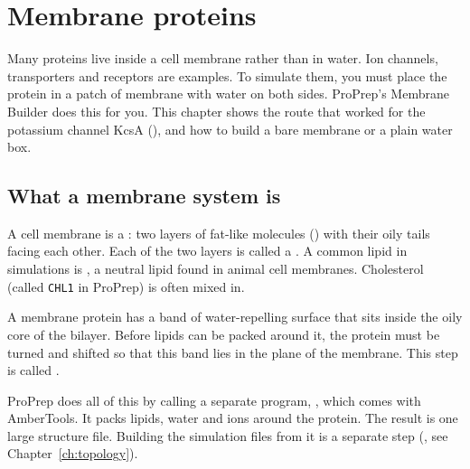 \chapter{Membrane proteins}
\label{ch:membrane}

Many proteins live inside a cell membrane rather than in water. Ion channels,
transporters and receptors are examples. To simulate them, you must place the
protein in a patch of membrane with water on both sides. ProPrep's Membrane
Builder does this for you. This chapter shows the route that worked for the
potassium channel KcsA (), and how to build a bare membrane or a
plain water box.

\begin{glance}
\end{glance}

\section{What a membrane system is}

A cell membrane is a : two layers of fat-like molecules
() with their oily tails facing each other. Each of the two layers
is called a . A common lipid in simulations is , a
neutral lipid found in animal cell membranes. Cholesterol (called
\texttt{CHL1} in ProPrep) is often mixed in.

A membrane protein has a band of water-repelling surface that sits inside the
oily core of the bilayer. Before lipids can be packed around it, the protein
must be turned and shifted so that this band lies in the plane of the
membrane. This step is called .

ProPrep does all of this by calling a separate program,
, which comes with AmberTools. It packs lipids, water and
ions around the protein. The result is one large structure file. Building the
simulation files from it is a separate step (, see
Chapter~\ref{ch:topology}).

